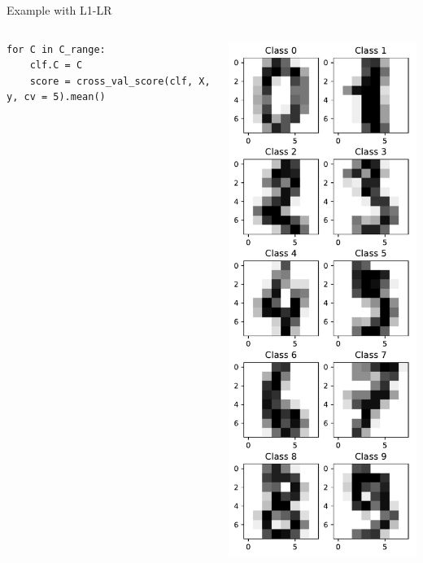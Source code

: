 \documentclass[10pt, aspectratio=169]{beamer} %
\begin{document}
\begin{frame}[fragile,allowframebreaks=0.8]{Example with L1-LR}
\begin{columns}
\begin{lstlisting}
for C in C_range:
    clf.C = C
    score = cross_val_score(clf, X, y, cv = 5).mean()    
\end{lstlisting}
\includegraphics[width=\textwidth]{digits.pdf}
\end{columns}
\end{frame}
\end{document}
